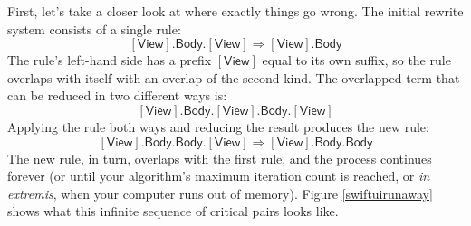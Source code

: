 \documentclass[headsepline,bibliography=totoc]{scrreport}
\newcommand{\namesym}[1]{\mathsf{#1}}
\newcommand{\proto}[1]{\bm{\mathsf{#1}}}
\newcommand{\protosym}[1]{[\proto{#1}]}
\theoremstyle{definition}
\theoremstyle{definition}
\theoremstyle{definition}
\begin{document}
First, let's take a closer look at where exactly things go wrong. The initial rewrite system consists of a single rule:
\[\protosym{View}.\namesym{Body}.\protosym{View}\Rightarrow\protosym{View}.\namesym{Body}\]
The rule's left-hand side has a prefix $\protosym{View}$ equal to its own suffix, so the rule overlaps with itself with an overlap of the second kind. The overlapped term that can be reduced in two different ways is:
\[\protosym{View}.\namesym{Body}.\protosym{View}.\namesym{Body}.\protosym{View}\]
Applying the rule both ways and reducing the result produces the new rule:
\[\protosym{View}.\namesym{Body}.\namesym{Body}.\protosym{View}\Rightarrow\protosym{View}.\namesym{Body}.\namesym{Body}\]
The new rule, in turn, overlaps with the first rule, and the process continues forever (or until your algorithm's maximum iteration count is reached, or \emph{in extremis}, when your computer runs out of memory). Figure \ref{swiftuirunaway} shows what this infinite sequence of critical pairs looks like.
\end{document}
